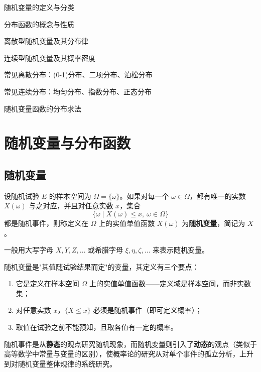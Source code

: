 \documentclass[lang=cn,11pt]{elegantbook}
\begin{document}
\begin{introduction}
  \item 随机变量的定义与分类
  \item 分布函数的概念与性质
  \item 离散型随机变量及其分布律
  \item 连续型随机变量及其概率密度
  \item 常见离散分布：(0-1)分布、二项分布、泊松分布
  \item 常见连续分布：均匀分布、指数分布、正态分布
  \item 随机变量函数的分布求法
\end{introduction}

\section{随机变量与分布函数}

\subsection{随机变量}

\begin{definition}[随机变量] \label{def:random-variable}
设随机试验 \(E\) 的样本空间为 \(\Omega = \{\omega\}\)。如果对每一个 \(\omega \in \Omega\)，都有唯一的实数 \(X(\omega)\) 与之对应，并且对任意实数 \(x\)，集合
\[
\{\omega \mid X(\omega) \le x,\ \omega \in \Omega\}
\]
都是随机事件，则称定义在 \(\Omega\) 上的实值单值函数 \(X(\omega)\) 为\textbf{随机变量}，简记为 \(X\)。
\end{definition}

一般用大写字母 \(X, Y, Z, \dots\) 或希腊字母 \(\xi, \eta, \zeta, \dots\) 来表示随机变量。

\begin{note}
随机变量是"其值随试验结果而定"的变量，其定义有三个要点：
\begin{enumerate}
    \item 它是定义在样本空间 \(\Omega\) 上的实值单值函数——定义域是样本空间，而非实数集；
    \item 对任意实数 \(x\)，\(\{X \le x\}\) 必须是随机事件（即可定义概率）；
    \item 取值在试验之前不能预知，且取各值有一定的概率。
\end{enumerate}
随机事件是从\textbf{静态}的观点研究随机现象，而随机变量则引入了\textbf{动态}的观点（类似于高等数学中常量与变量的区别），使概率论的研究从对单个事件的孤立分析，上升到对随机变量整体规律的系统研究。
\end{note}
\end{document}
